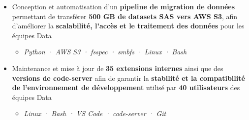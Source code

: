 \documentclass[10pt,english,french]{article}
\begin{document}
\begin{itemize}[leftmargin=0.5cm, label=\textbullet, itemsep=0.0625em]
    \item Conception et automatisation d'un \textbf{pipeline de migration de données}
          permettant de transférer \textbf{500\raisebox{0.20ex}{\small +} GB de datasets
              SAS vers AWS S3}, afin d'améliorer la \textbf{scalabilité, l'accès et le
              traitement des données} pour les équipes Data
          \begin{itemize}[leftmargin=0.25cm,label=\textendash,itemsep=0em,topsep=0.2em]
              \item \textit{\fontsize{10pt}{9pt}\selectfont Python · AWS S3 · fsspec · smbfs · Linux · Bash}
          \end{itemize}


    \item Maintenance et mise à jour de \textbf{35\raisebox{0.20ex}{\small +} extensions
              internes} ainsi que des \textbf{versions de code-server} afin de garantir la
          \textbf{stabilité et la compatibilité de l'environnement de développement}
          utilisé par \textbf{40\raisebox{0.20ex}{\small +} utilisateurs} des équipes
          Data
          \begin{itemize}[leftmargin=0.25cm,label=\textendash,itemsep=0em,topsep=0.2em]
              \item \textit{\fontsize{10pt}{9pt}\selectfont Linux · Bash · VS Code · code-server · Git}
          \end{itemize}

\end{itemize}
\end{document}

